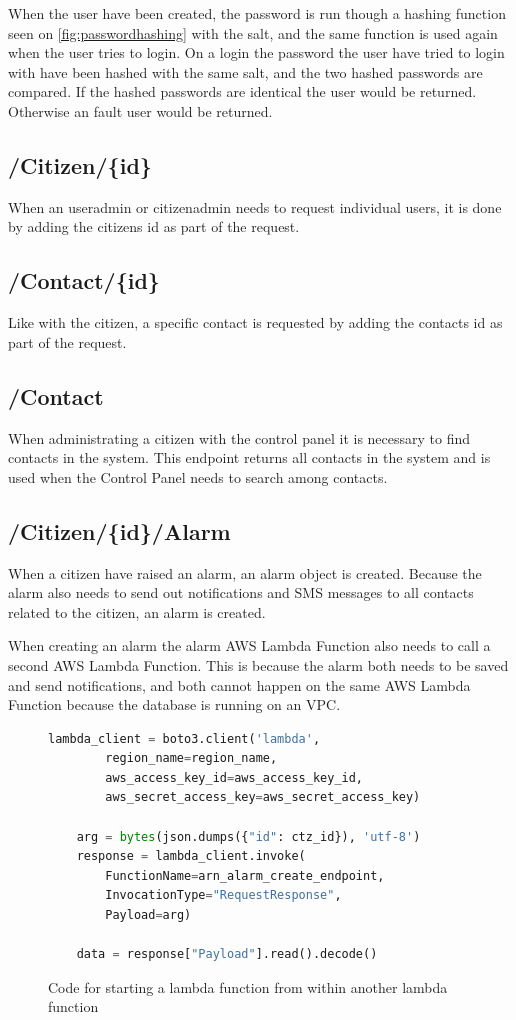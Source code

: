 When the user have been created, the password is run though a hashing function seen on \ref{fig:passwordhashing} with the salt, and the same function is used again when the user tries to login. On a login the password the user have tried to login with have been hashed with the same salt, and the two hashed passwords are compared. If the hashed passwords are identical the user would be returned. Otherwise an fault user would be returned.


\subsection*{/Citizen/\{id\}}
When an useradmin or citizenadmin needs to request individual users, it is done by adding the citizens id as part of the request.

\subsection*{/Contact/\{id\}}
Like with the citizen, a specific contact is requested by adding the contacts id as part of the request.

\subsection*{/Contact}
When administrating a citizen with the control panel it is necessary to find contacts in the system. This endpoint returns all contacts in the system and is used when the Control Panel needs to search among contacts.

\subsection*{/Citizen/\{id\}/Alarm}
When a citizen have raised an alarm, an alarm object is created. Because the alarm also needs to send out notifications and SMS messages to all contacts related to the citizen, an alarm is created. 

When creating an alarm the alarm AWS Lambda Function also needs to call a second AWS Lambda Function. This is because the alarm both needs to be saved and send notifications, and both cannot happen on the same AWS Lambda Function because the database is running on an VPC.

\begin{figure}[H]
    \centering
    \begin{lstlisting}[language=Python]
    lambda_client = boto3.client('lambda',
        region_name=region_name,
        aws_access_key_id=aws_access_key_id,
        aws_secret_access_key=aws_secret_access_key)

    arg = bytes(json.dumps({"id": ctz_id}), 'utf-8')
    response = lambda_client.invoke(
        FunctionName=arn_alarm_create_endpoint,
        InvocationType="RequestResponse",
        Payload=arg)

    data = response["Payload"].read().decode()
    \end{lstlisting}
    \caption{Code for starting a lambda function from within another lambda function}
    \label{fig:startlambda}
\end{figure}


